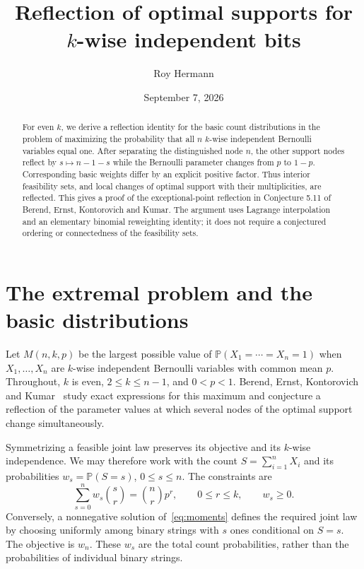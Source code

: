 \documentclass[11pt]{article}
\title{Reflection of optimal supports for\texorpdfstring{\\}{ }$k$-wise independent bits}
\author{Roy Hermann}
\date{September 7, 2026}
\theoremstyle{remark}
\newcommand{\Pp}{\mathbb P}
\begin{document}
\maketitle
\begin{abstract}
For even $k$, we derive a reflection identity for the basic count distributions in the problem of maximizing the probability that all $n$ $k$-wise independent Bernoulli variables equal one. After separating the distinguished node $n$, the other support nodes reflect by $s\mapsto n-1-s$ while the Bernoulli parameter changes from $p$ to $1-p$. Corresponding basic weights differ by an explicit positive factor. Thus interior feasibility sets, and local changes of optimal support with their multiplicities, are reflected. This gives a proof of the exceptional-point reflection in Conjecture 5.11 of Berend, Ernst, Kontorovich and Kumar. The argument uses Lagrange interpolation and an elementary binomial reweighting identity; it does not require a conjectured ordering or connectedness of the feasibility sets.
\end{abstract}

\section{The extremal problem and the basic distributions}

Let $M(n,k,p)$ be the largest possible value of
$\Pp(X_1=\cdots=X_n=1)$ when $X_1,\ldots,X_n$ are $k$-wise independent Bernoulli variables with common mean $p$.
Throughout, $k$ is even, $2\le k\le n-1$, and $0<p<1$.
Berend, Ernst, Kontorovich and Kumar~\cite{BEKK} study exact expressions for this maximum and conjecture a reflection of the parameter values at which several nodes of the optimal support change simultaneously.

Symmetrizing a feasible joint law preserves its objective and its $k$-wise independence. We may therefore work with the count $S=\sum_{i=1}^n X_i$ and its probabilities $w_s=\Pp(S=s)$, $0\le s\le n$. The constraints are
\begin{equation}\label{eq:moments}
 \sum_{s=0}^{n} w_s\binom{s}{r}=\binom{n}{r}p^r,
 \qquad 0\le r\le k,\qquad w_s\ge0.
\end{equation}
Conversely, a nonnegative solution of~\eqref{eq:moments} defines the required joint law by choosing uniformly among binary strings with $s$ ones conditional on $S=s$.
The objective is $w_n$. These $w_s$ are the total count probabilities, rather than the probabilities of individual binary strings.
\end{document}
